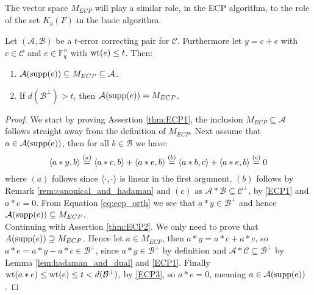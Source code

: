 The vector space $M_{ECP}$ will play a similar role, in the ECP algorithm, to the role of the set $K_{y}(F)$ in the basic algorithm.

\begin{theorem}\label{thm:ECP}
  Let $(\mathcal{A}, \mathcal{B})$ be a $t$-error correcting pair for $\mathcal{C}$. Furthermore let $y = c + e$ with $c \in \mathcal{C}$ and $e \in \mathbb{F}_q^n$ with $\mathrm{wt}(e) \leq t$. Then:
  \begin{enumerate}
    \item $\mathcal{A}(\textnormal{supp}(e)) \subseteq M_{ECP} \subseteq \mathcal{A}$. \label{thm:ECP1}
    \item If $d(\mathcal{B}^{\perp}) > t$, then $\mathcal{A}(\textnormal{supp}(e)) = M_{ECP}$. \label{thm:ECP2}
  \end{enumerate}
\end{theorem}
\begin{proof}
  We start by proving Assertion \ref{thm:ECP1}, the inclusion $M_{ECP} \subseteq \mathcal{A}$ follows straight away from the definition of $M_{ECP}$. Next assume that $a \in \mathcal{A}(\textnormal{supp}(e))$, then for all $b \in \mathcal{B}$ we have:
  \begin{equation}\label{eq:ecp_orth}
    \langle a * y, b\rangle \stackrel{(a)}{=} \langle a * c, b\rangle + \langle a * e, b\rangle \stackrel{(b)}{=} \langle a * b, c\rangle + \langle a * e, b\rangle \stackrel{(c)}{=} 0
  \end{equation}
  where $(a)$ follows since $\langle\cdot, \cdot\rangle$ is linear in the first argument, $(b)$ follows by Remark \ref{rem:canonical_and_hadaman} and $(c)$ as $\mathcal{A} * \mathcal{B} \subseteq \mathcal{C}^{\perp}$, by \ref{ECP1} and $a * e = 0$.
  From Equation \eqref{eq:ecp_orth} we see that $a * y \in \mathcal{B}^{\perp}$ and hence $\mathcal{A}(\textnormal{supp}(e)) \subseteq M_{ECP}$. \\
  Continuing with Assertion \ref{thm:ECP2}. We only need to prove that $A(\textnormal{supp}(e)) \supseteq M_{ECP}$. Hence let $a \in M_{ECP}$, then $a * y = a * c + a * e$, so $a * e = a * y - a * c \in \mathcal{B}^{\perp}$, since $a * y \in \mathcal{B}^{\perp}$ by definition and $\mathcal{A} * \mathcal{C} \subseteq \mathcal{B}^{\perp}$ by Lemma \ref{lem:hadaman_and_dual} and \ref{ECP1}. Finally $\mathrm{wt}(a * e) \leq \mathrm{wt}(e) \leq t < d(\mathcal{B}^{\perp})$, by \ref{ECP3}, so $a * e = 0$, meaning $a \in \mathcal{A}(\textnormal{supp}(e))$.
\end{proof}

